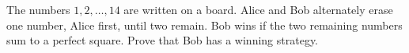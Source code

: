The numbers $1,2,\dots,14$ are written on a board. Alice and Bob alternately erase one number, Alice first, until two remain. Bob wins if the two remaining numbers sum to a perfect square. Prove that Bob has a winning strategy.
